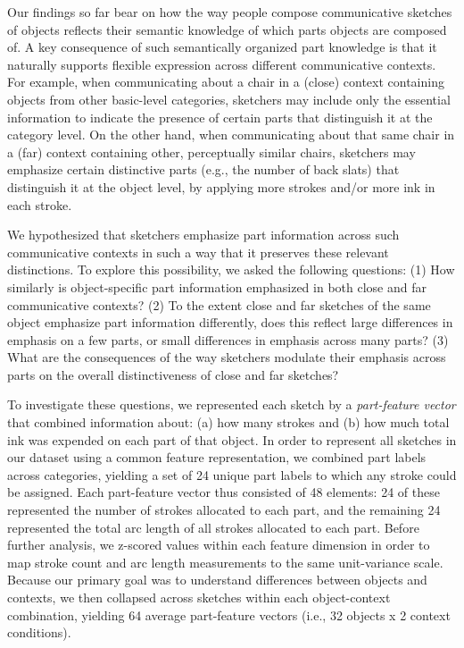 \documentclass[10pt,letterpaper]{article}
\begin{document}
Our findings so far bear on how the way people compose communicative sketches of objects reflects their semantic knowledge of which parts objects are composed of. 
A key consequence of such semantically organized part knowledge is that it naturally supports flexible expression across different communicative contexts. 
For example, when communicating about a chair in a (close) context containing objects from other basic-level categories, sketchers may include only the essential information to indicate the presence of certain parts that distinguish it at the category level. 
On the other hand, when communicating about that same chair in a (far) context containing other, perceptually similar chairs, sketchers may emphasize certain distinctive parts (e.g., the number of back slats) that distinguish it at the object level, by applying more strokes and/or more ink in each stroke.

We hypothesized that sketchers emphasize part information across such communicative contexts in such a way that it preserves these relevant distinctions. 
To explore this possibility, we asked the following questions: 
(1) How similarly is object-specific part information emphasized in both close and far communicative contexts? 
(2) To the extent close and far sketches of the same object emphasize part information differently, does this reflect large differences in emphasis on a few parts, or small differences in emphasis across many parts? 
(3) What are the consequences of the way sketchers modulate their emphasis across parts on the overall distinctiveness of close and far sketches? 

To investigate these questions, we represented each sketch by a \textit{part-feature vector} that combined information about: (a) how many strokes and (b) how much total ink was expended on each part of that object. 
In order to represent all sketches in our dataset using a common feature representation, we combined part labels across categories, yielding a set of 24 unique part labels to which any stroke could be assigned. 
Each part-feature vector thus consisted of 48 elements: 24 of these represented the number of strokes allocated to each part, and the remaining 24 represented the total arc length of all strokes allocated to each part. 
Before further analysis, we z-scored values within each feature dimension in order to map stroke count and arc length measurements to the same unit-variance scale. 
Because our primary goal was to understand differences between objects and contexts, we then collapsed across sketches within each object-context combination, yielding 64 average part-feature vectors (i.e., 32 objects x 2 context conditions). 
\end{document}
